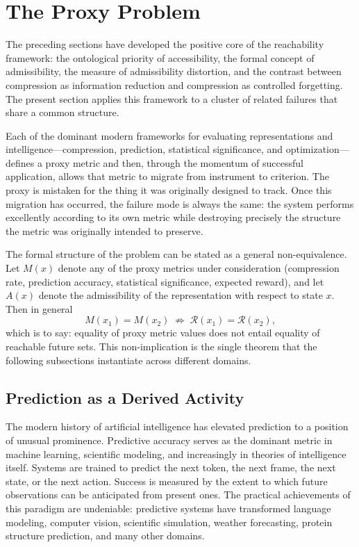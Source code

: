 \documentclass[12pt,a4paper]{article}
\theoremstyle{plain}
\theoremstyle{definition}
\theoremstyle{remark}
\begin{document}
\section{The Proxy Problem}

The preceding sections have developed the positive core of the reachability
framework: the ontological priority of accessibility, the formal concept of
admissibility, the measure of admissibility distortion, and the contrast
between compression as information reduction and compression as controlled
forgetting. The present section applies this framework to a cluster of
related failures that share a common structure.

Each of the dominant modern frameworks for evaluating representations and
intelligence---compression, prediction, statistical significance, and
optimization---defines a proxy metric and then, through the momentum of
successful application, allows that metric to migrate from instrument to
criterion. The proxy is mistaken for the thing it was originally designed to
track. Once this migration has occurred, the failure mode is always the same:
the system performs excellently according to its own metric while destroying
precisely the structure the metric was originally intended to preserve.

The formal structure of the problem can be stated as a general
non-equivalence. Let $M(x)$ denote any of the proxy metrics under
consideration (compression rate, prediction accuracy, statistical
significance, expected reward), and let $A(x)$ denote the admissibility
of the representation with respect to state $x$. Then in general
\[
  M(x_1) = M(x_2)
  \;\not\Rightarrow\;
  \mathcal{R}(x_1) = \mathcal{R}(x_2),
\]
which is to say: equality of proxy metric values does not entail equality of
reachable future sets. This non-implication is the single theorem that the
following subsections instantiate across different domains.

\subsection{Prediction as a Derived Activity}

The modern history of artificial intelligence has elevated prediction to a
position of unusual prominence. Predictive accuracy serves as the dominant
metric in machine learning, scientific modeling, and increasingly in theories
of intelligence itself. Systems are trained to predict the next token, the
next frame, the next state, or the next action. Success is measured by the
extent to which future observations can be anticipated from present ones. The
practical achievements of this paradigm are undeniable: predictive systems
have transformed language modeling, computer vision, scientific simulation,
weather forecasting, protein structure prediction, and many other domains.
\end{document}

